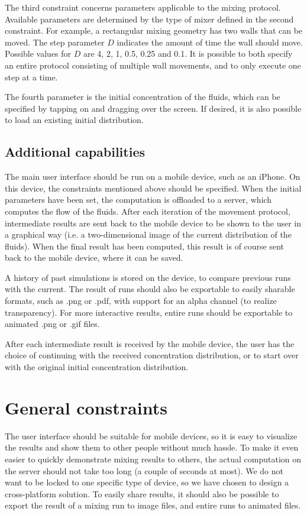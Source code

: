 The third constraint concerns parameters applicable to the mixing protocol. Available parameters are determined by the type of mixer defined in the second constraint. For example, a rectangular mixing geometry has two walls that can be moved. The step parameter $D$ indicates the amount of time the wall should move. Possible values for $D$ are 4, 2, 1, 0.5, 0.25 and 0.1. It is possible to both specify an entire protocol consisting of multiple wall movements, and to only execute one step at a time.
 
The fourth parameter is the initial concentration of the fluids, which can be specified by tapping on and dragging over the screen. If desired, it is also possible to load an existing initial distribution.

\subsection{Additional capabilities}
The main user interface should be run on a mobile device, such as an iPhone. On this device, the constraints mentioned above should be specified. When the initial parameters have been set, the computation is offloaded to a server, which computes the flow of the fluids. After each iteration of the movement protocol, intermediate results are sent back to the mobile device to be shown to the user in a graphical way (i.e. a two-dimensional image of the current distribution of the fluids). When the final result has been computed, this result is of course sent back to the mobile device, where it can be saved.

A history of past simulations is stored on the device, to compare previous runs with the current. The result of runs should also be exportable to easily sharable formats, such as .png or .pdf, with support for an alpha channel (to realize transparency). For more interactive results, entire runs should be exportable to animated .png or .gif files.

After each intermediate result is received by the mobile device, the user has the choice of continuing with the received concentration distribution, or to start over with the original initial concentration distribution.

\section{General constraints}
The user interface should be suitable for mobile devices, so it is easy to visualize the results and show them to other people without much hassle. To make it even easier to quickly demonstrate mixing results to others, the actual computation on the server should not take too long (a couple of seconds at most). We do not want to be locked to one specific type of device, so we have chosen to design a cross-platform solution. To easily share results, it should also be possible to export the result of a mixing run to image files, and entire runs to animated files.

